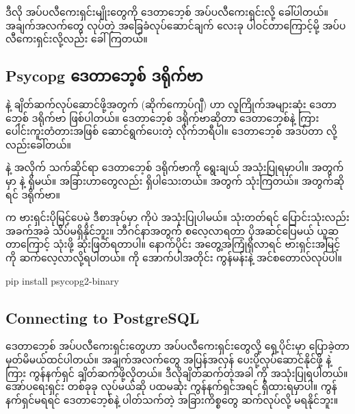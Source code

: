 ဒီလို အပ်ပလီကေးရှင်းမျိုးတွေကို ဒေတာဘေ့စ် အပ်ပလီကေးရှင်းလို့ ခေါ်ပါတယ်။ အချက်အလက်တွေ  လုပ်တဲ့ အခြေခံလုပ်ဆောင်ချက် လေးခု ပါဝင်တာကြောင့်မို့  အပ်ပလီကေးရှင်းလို့လည်း ခေါ်ကြတယ်။  

\subsection*{Psycopg ဒေတာဘေ့စ် ဒရိုက်ဗာ}
 နဲ့  ချိတ်ဆက်လုပ်ဆောင်ဖို့အတွက်  (ဆိုက်ကော့ပ်ဂျီ) ဟာ လူကြိုက်အများဆုံး ဒေတာဘေ့စ် ဒရိုက်ဗာ ဖြစ်ပါတယ်။ ဒေတာဘေ့စ် ဒရိုက်ဗာဆိုတာ ဒေတာဘေ့စ်နဲ့  ကြား ပေါင်းကူးတံတားအဖြစ် ဆောင်ရွက်ပေးတဲ့ လိုက်ဘရီပါ။ ဒေတာဘေ့စ် အဒပ်တာ  လို့လည်းခေါ်တယ်။

 နဲ့  အလိုက် သက်ဆိုင်ရာ ဒေတာဘေ့စ် ဒရိုက်ဗာကို ရွေးချယ် အသုံးပြုရမှာပါ။  အတွက်  မှာ  နဲ့  ရှိမယ်။ အခြားဟာတွေလည်း ရှိပါသေးတယ်။  အတွက်  သုံးကြတယ်။  အတွက်ဆိုရင်  ဒရိုက်ဗာ။ 

 က ဗားရှင်းပိုမြင့်ပေမဲ့ ဒီစာအုပ်မှာ  ကိုပဲ အသုံးပြုပါမယ်။  သုံးတတ်ရင်  ပြောင်းသုံးလည်း အခက်အခဲ သိပ်မရှိနိုင်ဘူး။ ဘီဂင်နာအတွက် စလေ့လာရတာ ပိုအဆင်ပြေမယ် ယူဆတာကြောင့်  သုံးဖို့ ဆုံးဖြတ်ရတာပါ။ နောက်ပိုင်း အတွေ့အကြုံရှိလာရင် ဗားရှင်းအမြင့်ကို ဆက်လေ့လာလို့ရပါတယ်။  ကို အောက်ပါအတိုင်း  ကွန်မန်းနဲ့  အင်စတောလ်လုပ်ပါ။
%
\begin{codetxt}
pip install psycopg2-binary 
\end{codetxt}
%


\subsection*{Connecting to PostgreSQL}
ဒေတာဘေ့စ် အပ်ပလီကေးရှင်းတွေဟာ  အပ်ပလီကေးရှင်းတွေလို့ ရှေ့ပိုင်းမှာ ပြောခဲ့တာ မှတ်မိမယ်ထင်ပါတယ်။ အချက်အလက်တွေ အပြန်အလှန် ပေးပို့လုပ်ဆောင်နိုင်ဖို့  နဲ့  ကြား ကွန်နက်ရှင် ချိတ်ဆက်ဖို့လိုတယ်။ ဒီလိုချိတ်ဆက်တဲ့အခါ  ကို အသုံးပြုရပါတယ်။  အော်ပရေးရှင်း တစ်ခုခု လုပ်မယ်ဆို ပထမဆုံး ကွန်နက်ရှင်အရင် ရှိထားရမှာပါ။ ကွန်နက်ရှင်မရရင် ဒေတာဘေ့စ်နဲ့ ပါတ်သက်တဲ့ အခြားကိစ္စတွေ ဆက်လုပ်လို့ မရနိုင်ဘူး။ 

